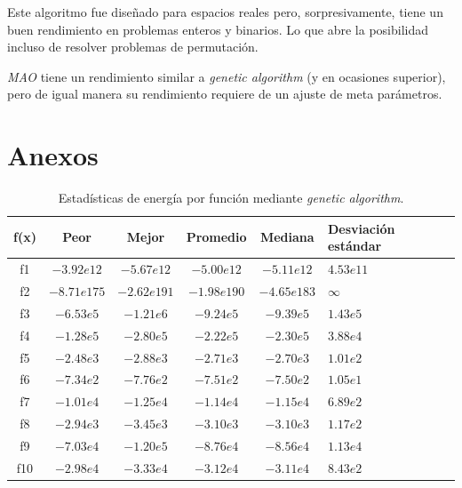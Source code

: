 \documentclass[12pt,twoside]{report}
\begin{document}
	Este algoritmo fue diseñado para espacios reales pero, sorpresivamente, tiene un buen rendimiento en problemas enteros y binarios. Lo que abre la posibilidad incluso de resolver problemas de permutación.
	
	\textit{MAO} tiene un rendimiento similar a \textit{genetic algorithm} (y en ocasiones superior), pero de igual manera su rendimiento requiere de un ajuste de meta parámetros. 

	\clearpage
	
	
	
	\clearpage
	\chapter*{Anexos}

	\begin{table}[H]
		\centering
		\begin{tabular}{|c|c|c|c|c|p{2.1cm}|}  
			\hline
			\textbf{f(x)} & \textbf{Peor} & \textbf{Mejor} & \textbf{Promedio} & \textbf{Mediana} & \textbf{Desviación estándar} \\  
			\hline
			f1  & \(-3.92e{12}\) & \(-5.67e{12}\) & \(-5.00e{12}\) & \(-5.11e{12}\) & \(4.53e{11}\) \\ 
			f2  & \(-8.71e{175}\) & \(-2.62e{191}\) & \(-1.98e{190}\) & \(-4.65e{183}\) & \(\infty\) \\ 
			f3  & \(-6.53e{5}\) & \(-1.21e{6}\) & \(-9.24e{5}\) & \(-9.39e{5}\) & \(1.43e{5}\) \\ 
			f4  & \(-1.28e{5}\) & \(-2.80e{5}\) & \(-2.22e{5}\) & \(-2.30e{5}\) & \(3.88e{4}\) \\ 
			f5  & \(-2.48e{3}\) & \(-2.88e{3}\) & \(-2.71e{3}\) & \(-2.70e{3}\) & \(1.01e{2}\) \\ 
			f6  & \(-7.34e{2}\) & \(-7.76e{2}\) & \(-7.51e{2}\) & \(-7.50e{2}\) & \(1.05e{1}\) \\ 
			f7  & \(-1.01e{4}\) & \(-1.25e{4}\) & \(-1.14e{4}\) & \(-1.15e{4}\) & \(6.89e{2}\) \\ 
			f8  & \(-2.94e{3}\) & \(-3.45e{3}\) & \(-3.10e{3}\) & \(-3.10e{3}\) & \(1.17e{2}\) \\ 
			f9  & \(-7.03e{4}\) & \(-1.20e{5}\) & \(-8.76e{4}\) & \(-8.56e{4}\) & \(1.13e{4}\) \\ 
			f10 & \(-2.98e{4}\) & \(-3.33e{4}\) & \(-3.12e{4}\) & \(-3.11e{4}\) & \(8.43e{2}\) \\
			\hline
		\end{tabular}
		\caption{Estadísticas de energía por función mediante \textit{genetic algorithm}.}
		\label{tab:res_cec_res_ga}
	\end{table}
	
\end{document}
